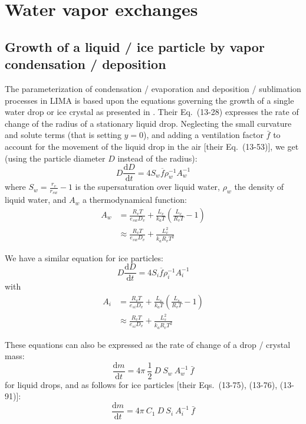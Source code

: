 {\section{Water vapor exchanges}

\subsection{Growth of a liquid / ice particle by vapor condensation / deposition}

The parameterization of condensation / evaporation and deposition / sublimation processes in LIMA is based upon the equations governing the growth of a single water drop or ice crystal as presented in \citet{Pruppacher1997}. Their Eq.\ (13-28) expresses the rate of change of the radius of a stationary liquid drop. Neglecting the small curvature and solute terms (that is setting $y=0$), and adding a ventilation factor $\bar{f}$ to account for the movement of the liquid drop in the air [their Eq.\ (13-53)], we get (using the particle diameter $D$ instead of the radius):
\begin{equation}
\label{size-evol-liquid}
 D \frac{\mathrm{d}D}{\mathrm{d}t} = 4 S_w \overline{f} \rho_w^{-1} A_w^{-1}
\end{equation}
where $S_w = \frac{r_v}{r_{sw}} -1$ is the supersaturation over liquid water, $\rho_w$ the density of liquid water, and $A_w$ a thermodynamical function:
\begin{align}
 A_w &= \frac{R_v T}{e_{sw} D_v} + \frac{L_v}{k_a T} \left( \frac{L_v}{R_v T} - 1 \right) \\
\label{Aw}
 &\approx \frac{R_v T}{e_{sw} D_v} + \frac{L_v^2}{k_a R_v T^2}
\end{align}

We have a similar equation for ice particles:
\begin{equation}
\label{size-evol-ice}
 D \frac{\mathrm{d}D}{\mathrm{d}t} = 4 S_i \overline{f} \rho_i^{-1} A_i^{-1}
\end{equation}
with
\begin{align}
 A_i &= \frac{R_v T}{e_{si} D_v} + \frac{L_s}{k_a T} \left( \frac{L_s}{R_v T} - 1 \right) \\
\label{Ai}
 &\approx \frac{R_v T}{e_{si} D_v} + \frac{L_s^2}{k_a R_v T^2}
\end{align}

These equations can also be expressed as the rate of change of a drop / crystal mass:
\begin{equation}
\label{mass-evol-liquid}
 \frac{\mathrm{d}m}{\mathrm{d}t} = 4\pi ~ \frac{1}{2} ~ D ~ S_w ~ A_w^{-1} ~ \bar{f} 
\end{equation}
for liquid drops, and as follows for ice particles [their Eqs.\ (13-75), (13-76), (13-91)]:
\begin{equation}
\label{mass-evol-ice}
 \frac{\mathrm{d}m}{\mathrm{d}t} = 4\pi ~ C_1 ~ D ~ S_i ~ A_i^{-1} ~ \bar{f} 
\end{equation}

}
